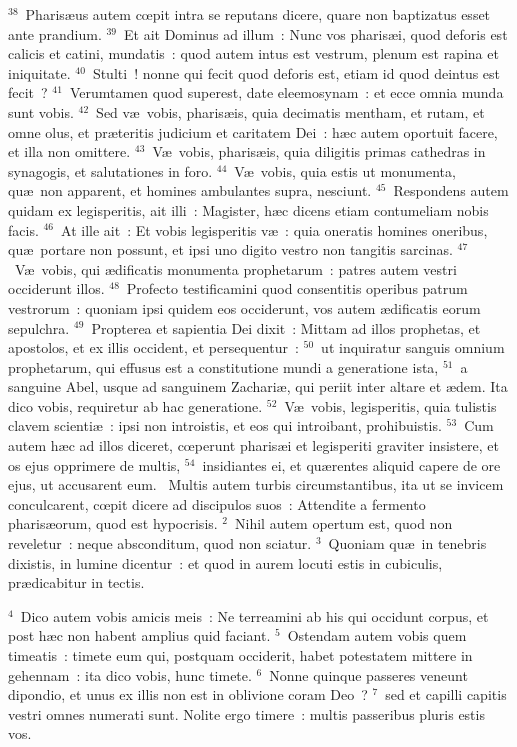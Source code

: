 ${}^{38}$~Pharis\ae us autem cœpit intra se reputans dicere, quare non baptizatus esset ante prandium.
${}^{39}$~Et ait Dominus ad illum~: Nunc vos pharis\ae i, quod deforis est calicis et catini, mundatis~: quod autem intus est vestrum, plenum est rapina et iniquitate.
${}^{40}$~Stulti~! nonne qui fecit quod deforis est, etiam id quod deintus est fecit~?
${}^{41}$~Verumtamen quod superest, date eleemosynam~: et ecce omnia munda sunt vobis.
${}^{42}$~Sed v\ae\ vobis, pharis\ae is, quia decimatis mentham, et rutam, et omne olus, et pr\ae teritis judicium et caritatem Dei~: h\ae c autem oportuit facere, et illa non omittere.
${}^{43}$~V\ae\ vobis, pharis\ae is, quia diligitis primas cathedras in synagogis, et salutationes in foro.
${}^{44}$~V\ae\ vobis, quia estis ut monumenta, qu\ae\ non apparent, et homines ambulantes supra, nesciunt.
${}^{45}$~Respondens autem quidam ex legisperitis, ait illi~: Magister, h\ae c dicens etiam contumeliam nobis facis.
${}^{46}$~At ille ait~: Et vobis legisperitis v\ae~: quia oneratis homines oneribus, qu\ae\ portare non possunt, et ipsi uno digito vestro non tangitis sarcinas.
${}^{47}$~V\ae\ vobis, qui \ae dificatis monumenta prophetarum~: patres autem vestri occiderunt illos.
${}^{48}$~Profecto testificamini quod consentitis operibus patrum vestrorum~: quoniam ipsi quidem eos occiderunt, vos autem \ae dificatis eorum sepulchra.
${}^{49}$~Propterea et sapientia Dei dixit~: Mittam ad illos prophetas, et apostolos, et ex illis occident, et persequentur~:
${}^{50}$~ut inquiratur sanguis omnium prophetarum, qui effusus est a constitutione mundi a generatione ista,
${}^{51}$~a sanguine Abel, usque ad sanguinem Zachari\ae , qui periit inter altare et \ae dem. Ita dico vobis, requiretur ab hac generatione.
${}^{52}$~V\ae\ vobis, legisperitis, quia tulistis clavem scienti\ae~: ipsi non introistis, et eos qui introibant, prohibuistis.
${}^{53}$~Cum autem h\ae c ad illos diceret, cœperunt pharis\ae i et legisperiti graviter insistere, et os ejus opprimere de multis,
${}^{54}$~insidiantes ei, et qu\ae rentes aliquid capere de ore ejus, ut accusarent eum.
~Multis autem turbis circumstantibus, ita ut se invicem conculcarent, cœpit dicere ad discipulos suos~: Attendite a fermento pharis\ae orum, quod est hypocrisis.
${}^{2}$~Nihil autem opertum est, quod non reveletur~: neque absconditum, quod non sciatur.
${}^{3}$~Quoniam qu\ae\ in tenebris dixistis, in lumine dicentur~: et quod in aurem locuti estis in cubiculis, pr\ae dicabitur in tectis.


${}^{4}$~Dico autem vobis amicis meis~: Ne terreamini ab his qui occidunt corpus, et post h\ae c non habent amplius quid faciant.
${}^{5}$~Ostendam autem vobis quem timeatis~: timete eum qui, postquam occiderit, habet potestatem mittere in gehennam~: ita dico vobis, hunc timete.
${}^{6}$~Nonne quinque passeres veneunt dipondio, et unus ex illis non est in oblivione coram Deo~?
${}^{7}$~sed et capilli capitis vestri omnes numerati sunt. Nolite ergo timere~: multis passeribus pluris estis vos.


